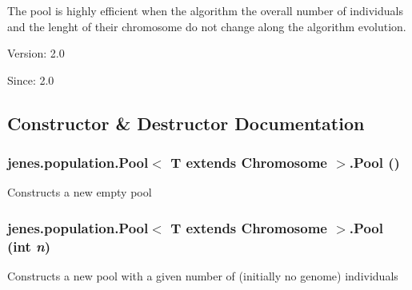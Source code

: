 The pool is highly efficient when the algorithm the overall number of individuals and the lenght of their chromosome do not change along the algorithm evolution.

\begin{Desc}
\item[Version:]2.0 \end{Desc}
\begin{Desc}
\item[Since:]2.0 \end{Desc}


\subsection{Constructor \& Destructor Documentation}
\hypertarget{classjenes_1_1population_1_1_pool_3_01_t_01extends_01_chromosome_01_4_4bd84795aaada004e3abac72137269fa}{
\subsubsection[Pool]{\setlength{\rightskip}{0pt plus 5cm}jenes.population.Pool$<$ T extends Chromosome $>$.Pool ()}}
\label{classjenes_1_1population_1_1_pool_3_01_t_01extends_01_chromosome_01_4_4bd84795aaada004e3abac72137269fa}


Constructs a new empty pool \hypertarget{classjenes_1_1population_1_1_pool_3_01_t_01extends_01_chromosome_01_4_1f1455e87c094df383563c96e88c4d1b}{
\subsubsection[Pool]{\setlength{\rightskip}{0pt plus 5cm}jenes.population.Pool$<$ T extends Chromosome $>$.Pool (int {\em n})}}
\label{classjenes_1_1population_1_1_pool_3_01_t_01extends_01_chromosome_01_4_1f1455e87c094df383563c96e88c4d1b}


Constructs a new pool with a given number of (initially no genome) individuals 

